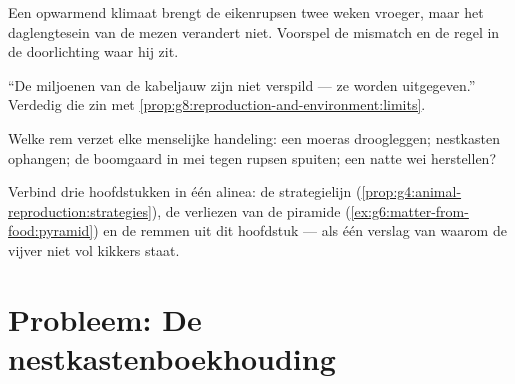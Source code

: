 \begin{exercise}[$\star\star$]\label{exo:g8:reproduction-and-environment:9}
Een opwarmend klimaat brengt de eikenrupsen twee weken vroeger, maar het
daglengtesein van de mezen verandert niet. Voorspel de mismatch en de
regel in de doorlichting waar hij zit.
\end{exercise}

\begin{exercise}[$\star\star$]\label{exo:g8:reproduction-and-environment:10}
``De miljoenen van de kabeljauw zijn niet verspild --- ze worden
uitgegeven.'' Verdedig die zin met
\cref{prop:g8:reproduction-and-environment:limits}.
\end{exercise}

\begin{exercise}[$\star\star$]\label{exo:g8:reproduction-and-environment:11}
Welke rem verzet elke menselijke handeling: een moeras droogleggen;
nestkasten ophangen; de boomgaard in mei tegen rupsen spuiten; een natte
wei herstellen?
\end{exercise}

\begin{exercise}[$\star\star\star$]\label{exo:g8:reproduction-and-environment:12}
Verbind drie hoofdstukken in één alinea: de strategielijn
(\cref{prop:g4:animal-reproduction:strategies}), de verliezen van de
piramide (\cref{ex:g6:matter-from-food:pyramid}) en de remmen uit dit
hoofdstuk --- als één verslag van waarom de vijver niet vol kikkers staat.
\end{exercise}

\section{Probleem: De nestkastenboekhouding}

